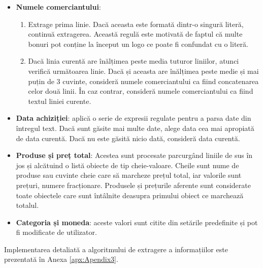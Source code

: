 \begin{itemize}
  \item
  \textbf{Numele comerciantului}:
  \begin{enumerate}
      \item
      Extrage prima linie. Dacă aceasta este formată dintr-o singură literă, continuă extragerea. Această regulă este motivată de faptul că multe bonuri pot conține la început un logo ce poate fi confundat cu o literă.
      \item
      Dacă linia curentă are înălțimea peste media tuturor liniilor, atunci verifică următoarea linie. Dacă și aceasta are înălțimea peste medie și mai puțin de 3 cuvinte, consideră numele comerciantului ca fiind concatenarea celor două linii. În caz contrar, consideră numele comerciantului ca fiind textul liniei curente.
  \end{enumerate}
  \item
  \textbf{Data achiziției}: aplică o serie de expresii regulate pentru a parsa date din întregul text. Dacă sunt găsite mai multe date, alege data cea mai apropiată de data curentă. Dacă nu este găsită nicio dată, consideră data curentă.
  \item
  \textbf{Produse și preț total}: Acestea sunt procesate parcurgând liniile de sus în jos și alcătuind o listă obiecte de tip cheie-valoare. Cheile sunt nume de produse sau cuvinte cheie care să marcheze prețul total, iar valorile sunt prețuri, numere fracționare. Produsele și prețurile aferente sunt considerate toate obiectele care sunt întâlnite deasupra primului obiect ce marchează totalul.
  \item
  \textbf{Categoria și moneda}: aceste valori sunt citite din setările predefinite și pot fi modificate de utilizator.
\end{itemize}

Implementarea detaliată a algoritmului de extragere a informațiilor este prezentată în Anexa \ref{apx:Apendix3}.


